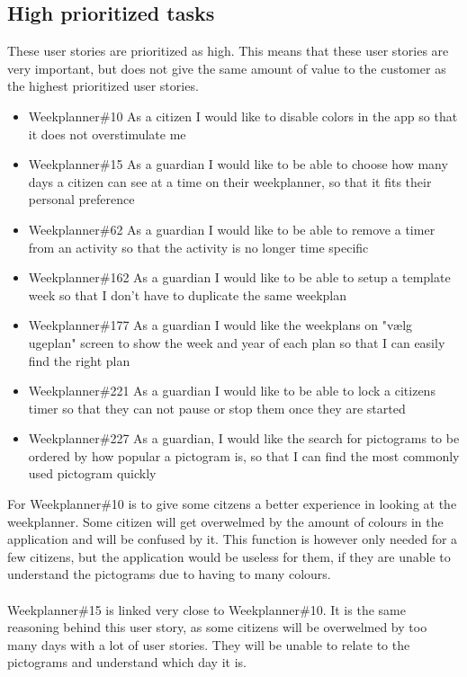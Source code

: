 \subsection{High prioritized tasks}
These user stories are prioritized as high. 
This means that these user stories are very important, but does not give the same amount of value to the customer as the highest prioritized user stories.
\begin{itemize}
    \item Weekplanner\#10 As a citizen I would like to disable colors in the app so that it does not overstimulate me
    \item Weekplanner\#15 As a guardian I would like to be able to choose how many days a citizen can see at a time on their weekplanner, so that it fits their personal preference 
    \item Weekplanner\#62 As a guardian I would like to be able to remove a timer from an activity so that the activity is no longer time specific
    \item Weekplanner\#162 As a guardian I would like to be able to setup a template week so that I don't have to duplicate the same weekplan  
    \item Weekplanner\#177 As a guardian I would like the weekplans on "vælg ugeplan" screen to show the week and year of each plan so that I can easily find the right plan 
    \item Weekplanner\#221 As a guardian I would like to be able to lock a citizens timer so that they can not pause or stop them once they are started
    \item Weekplanner\#227 As a guardian, I would like the search for pictograms to be ordered by how popular a pictogram is, so that I can find the most commonly used pictogram quickly
\end{itemize}
\noindent
For Weekplanner\#10 is to give some citzens a better experience in looking at the weekplanner. 
Some citizen will get overwelmed by the amount of colours in the application and will be confused by it. 
This function is however only needed for a few citizens, but the application would be useless for them, if they are unable to understand the pictograms due to having to many colours.
\\\\
Weekplanner\#15 is linked very close to Weekplanner\#10. 
It is the same reasoning behind this user story, as some citizens will be overwelmed by too many days with a lot of user stories. 
They will be unable to relate to the pictograms and understand which day it is.
